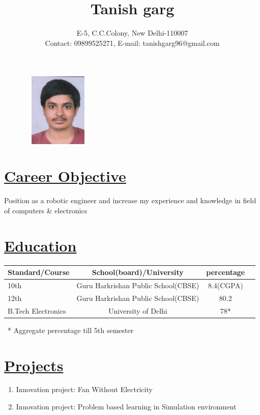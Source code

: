 \documentclass[14pt,a4paper,twoside]{article}
\begin{document}
	
	\title{Tanish garg}
		\author{E-5, C.C.Colony, New Delhi-110007 \\ Contact: 09899525271,  E-mail: tanishgarg96@gmail.com}
	\maketitle
	
	\begin{figure}[!h]
		\centering
		\includegraphics[width=3.5cm,height=3.5cm]{passportpic001}
	\end{figure}		
		
	\section*{\underline{\textbf{Career Objective}}}

	Position as a robotic engineer and increase my experience and knowledge in field of computers \& electronics
	
	\section*{\underline{\textbf{Education}}}
		\begin{tabular}{|l||c||c||r|}
			\hline
			Standard/Course & School(board)/University & percentage \\
			\hline
			10th & Guru Harkrishan Public School(CBSE) & 8.4(CGPA)\\
			\hline
			12th & Guru Harkrishan Public School(CBSE) & 80.2\\
			\hline
			B.Tech Electronics & University of Delhi & 78*\\
			
		\end{tabular}
		
		
	  \ * Aggregate percentage till 5th semester	
	\section*{\underline{\textbf{Projects}}}
		\begin{enumerate}
			\item Innovation project: Fan Without Electricity
			\item Innovation project: Problem based learning in Simulation environment 
		\end{enumerate}
	
\end{document}
